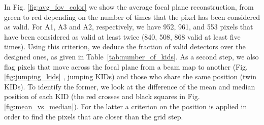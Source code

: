 In Fig. \ref{fig:avg_fov_color} we show the average focal plane
reconstruction, from green to red depending on the number of times
that the pixel has been considered as valid. For A1, A3 and A2,
respectively, we have 952, 961, and 553 pixels that have been
considered as valid at least twice (840, 508, 868 valid at least five
times).
Using this criterion, we deduce the fraction of valid
detectors over the designed ones, as given in Table~\ref{tab:number_of_kids}. 
As a second step, we also flag pixels that move across the focal plane from a 
beam map to another (Fig. \ref{fig:jumping_kids} , jumping KIDs) and those 
who share the same position (twin KIDs). To identify the former, we look at the difference 
of the mean and median position of each KID (the red crosses and black squares in 
Fig. \ref{fig:mean_vs_median}). For the latter a criterion on the position is applied in 
order to find the pixels that are closer than the grid step.



\\


